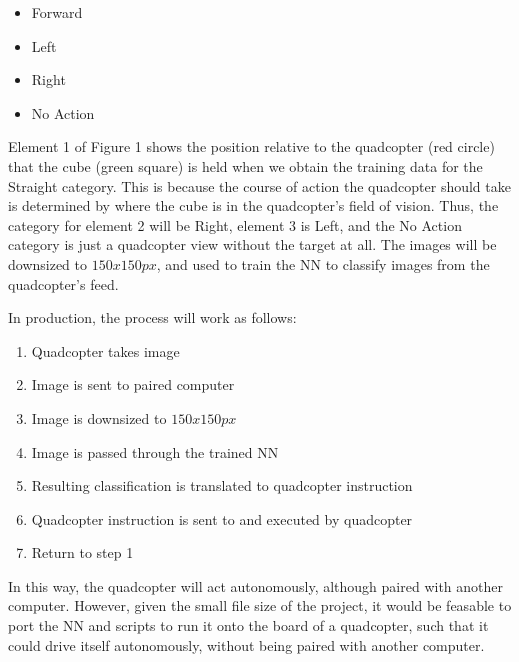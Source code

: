 \documentclass[12pt]{article}
\begin{document}
{	\begin{itemize}
		\item Forward
		\item Left
		\item Right
		\item No Action
	\end{itemize}

	\quad Element 1 of Figure 1 shows the position relative to the quadcopter (red circle) that the cube (green square) is held when we obtain the training data for the Straight category. 
	This is because the course of action the quadcopter should take is determined by where the cube is in the quadcopter's field of vision. 
	Thus, the category for element 2 will be Right, element 3 is Left, and the No Action category is just a quadcopter view without the target at all. 
	The images will be downsized to $150x150px$, and used to train the NN to classify images from the quadcopter's feed. \newline

	\quad In production, the process will work as follows:
	
	\begin{enumerate}
		\item{Quadcopter takes image}
		\item{Image is sent to paired computer}
		\item{Image is downsized to $150x150px$}
		\item{Image is passed through the trained NN}
		\item{Resulting classification is translated to quadcopter instruction}
		\item{Quadcopter instruction is sent to and executed by quadcopter}	
		\item{Return to step 1}
	\end{enumerate}
	
	\quad In this way, the quadcopter will act autonomously, although paired with another computer. 
	However, given the small file size of the project, it would be feasable to port the NN and scripts to run it onto the board of a quadcopter, such that it could drive itself autonomously, without being paired with another computer.

}
\end{document}
